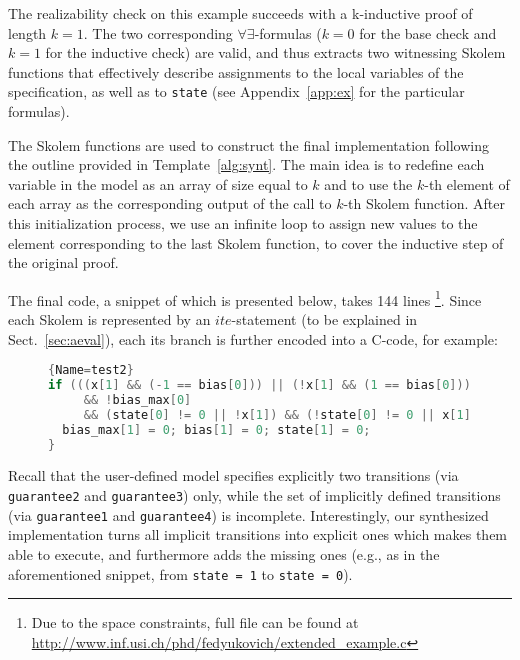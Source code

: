 The realizability check on this example succeeds with a k-inductive
proof of length $k = 1$. The two corresponding
$\forall\exists$-formulas ($k=0$ for the base check and $k=1$ for the
inductive check) are valid, and thus \aeval extracts two witnessing
Skolem functions that effectively describe assignments to the local
variables of the specification, as well as to \texttt{state} (see
Appendix~\ref{app:ex} for the particular formulas).

The Skolem functions are used to construct the final implementation
following the outline provided in Template~\ref{alg:synt}.
The main idea is to redefine each variable in the model
as an array of size equal to $k$ and
to use the $k$-th element of each array as the corresponding output of the call
to $k$-th Skolem function. After this initialization process, we use an infinite
loop to assign new values to the element corresponding to the last Skolem
function, to cover the inductive step of the original proof.

The final code, a snippet of which is presented below, takes 144 lines%
\footnote{Due to the space constraints, full file can be found at \url{http://www.inf.usi.ch/phd/fedyukovich/extended_example.c}}.
Since each Skolem is represented by an $\mathit{ite}$-statement (to be explained in Sect.~\ref{sec:aeval}), each its branch is further encoded into a C-code, for example:

\begin{figure}[h]
\vspace{-2em}
\begin{lstlisting}[language=C]{Name=test2}
if (((x[1] && (-1 == bias[0])) || (!x[1] && (1 == bias[0])))
     && !bias_max[0]
     && (state[0] != 0 || !x[1]) && (!state[0] != 0 || x[1])) {
  bias_max[1] = 0; bias[1] = 0; state[1] = 0;
}
\end{lstlisting}%
\vspace{-2em}
\end{figure}%


Recall that the user-defined model specifies explicitly two transitions (via \texttt{guarantee2} and \texttt{guarantee3}) only, while the set of implicitly defined transitions (via \texttt{guarantee1} and \texttt{guarantee4}) is incomplete.
Interestingly, our synthesized implementation turns all implicit transitions into explicit ones which makes them able to execute, and furthermore adds the missing ones (e.g., as in the aforementioned snippet, from \texttt{state = 1} to \texttt{state = 0}).

